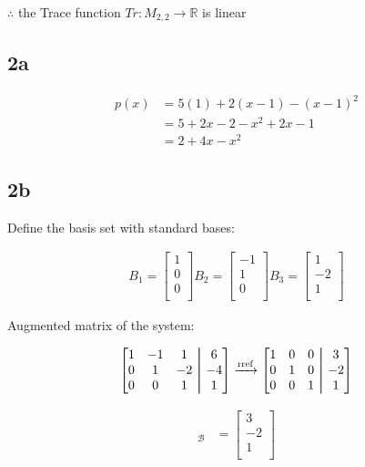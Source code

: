 \documentclass{article}
\newcommand\aug{\fboxsep=-\fboxrule\!\!\!\fbox{\strut}\!\!\!}
\begin{document}
$\therefore$ the Trace function $Tr : M_{2,2} \rightarrow \mathbb{R}$ is linear
\newpage
\subsection*{2a}
\begin{align*}
    p(x) &= 5(1) + 2(x-1) - (x-1)^2\\
    &= 5 + 2x - 2 - x^2 + 2x - 1\\
    &= 2+ 4x -x^2
\end{align*}
\subsection*{2b}
Define the basis set with standard bases:

\begin{align*}
B_1 = \begin{bmatrix}
1\\
0\\
0\\
\end{bmatrix} B_2 = \begin{bmatrix}
-1\\
1\\
0\\
\end{bmatrix} B_3 = \begin{bmatrix}
1\\
-2\\
1\\
\end{bmatrix}
\end{align*}

Augmented matrix of the system:

\begin{align*}
\begin{bmatrix}
1 & -1 & 1  &\aug & 6 \\
0 & 1  & -2 &\aug & -4\\
0 & 0  & 1  &\aug & 1
\end{bmatrix} \xrightarrow{\text{rref}} \begin{bmatrix}
1 & 0 & 0 &\aug & 3 \\
0 & 1 & 0 &\aug & -2\\
0 & 0 & 1 &\aug & 1
\end{bmatrix}
\end{align*}

\begin{align*}
[q(x)]_{\mathcal{B}} &= \begin{bmatrix}
3\\
-2\\
1\\
\end{bmatrix}
\end{align*}
\end{document}
